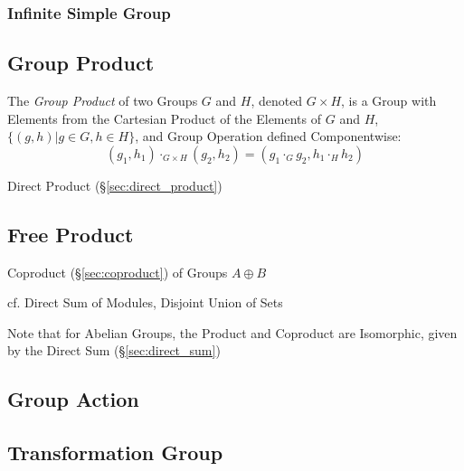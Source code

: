 \subsubsection{Infinite Simple Group}\label{sec:infinite_simple_group}



\subsection{Group Product}\label{sec:group_product}

The \emph{Group Product} of two Groups $G$ and $H$, denoted $G \times
H$, is a Group with Elements from the Cartesian Product of the
Elements of $G$ and $H$, $\{(g,h) | g \in G, h \in H\}$, and Group
Operation defined Componentwise:
\[
    (g_1, h_1) \cdot_{G \times H} (g_2, h_2)
    = (g_1 \cdot_G g_2, h_1 \cdot_H h_2)
\]

Direct Product (\S\ref{sec:direct_product})



\subsection{Free Product}\label{sec:free_product}

Coproduct (\S\ref{sec:coproduct}) of Groups $A \oplus B$

cf. Direct Sum of Modules, Disjoint Union of Sets

\HandRight\; Note that for Abelian Groups, the Product and Coproduct
are Isomorphic, given by the Direct Sum (\S\ref{sec:direct_sum})



\subsection{Group Action}\label{sec:group_action}

\subsection{Transformation Group}\label{sec:transformation_group}

